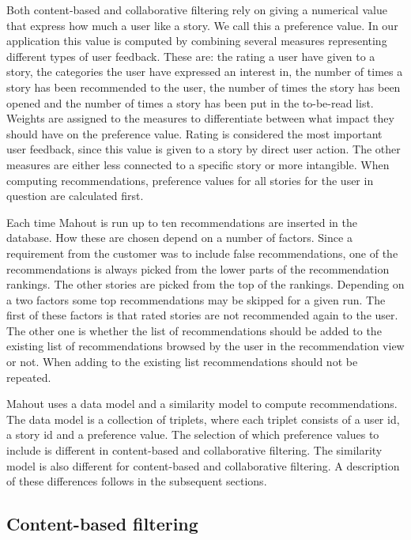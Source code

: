 Both content-based and collaborative filtering rely on giving a numerical value that express how much a user like a story. We call this a preference value. In our application this value is computed by combining several measures representing different types of user feedback. These are: the rating a user have given to a story, the categories the user have expressed an interest in, the number of times a story has been recommended to the user, the number of times the story has been opened and the number of times a story has been put in the to-be-read list. Weights are assigned to the measures to differentiate between what impact they should have on the preference value. Rating is considered the most important user feedback, since this value is given to a story by direct user action. The other measures are either less connected to a specific story or more intangible. When computing recommendations, preference values for all stories for the user in question are calculated first.\newline

Each time Mahout is run up to ten recommendations are inserted in the database. How these are chosen depend on a number of factors. Since a requirement from the customer was to include false recommendations, one of the recommendations is always picked from the lower parts of the recommendation rankings. The other stories are picked from the top of the rankings. Depending on a two factors some top recommendations may be skipped for a given run. The first of these factors is that rated stories are not recommended again to the user. The other one is whether the list of recommendations should be added to the existing list of recommendations browsed by the user in the recommendation view or not. When adding to the existing list recommendations should not be repeated.\newline

Mahout uses a data model and a similarity model to compute recommendations. The data model is a collection of triplets, where each triplet consists of a user id, a story id and a preference value. The selection of which preference values to include is different in content-based and collaborative filtering. The similarity model is also different for content-based and collaborative filtering. A description of these differences follows in the subsequent sections.    

\subsection{Content-based filtering}

